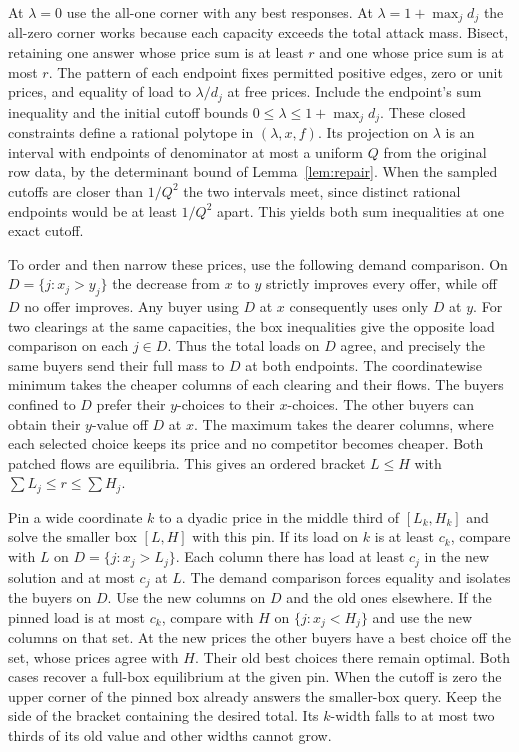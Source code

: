 \documentclass[11pt]{article}
\begin{document}
At \(\lambda=0\) use the all-one corner with any best responses. At
\(\lambda=1+\max_jd_j\) the all-zero corner works because each
capacity exceeds the total attack mass. Bisect, retaining one answer
whose price sum is at least \(r\) and one whose price sum is at most
\(r\). The pattern of each endpoint fixes permitted positive edges,
zero or unit prices, and equality of load to \(\lambda/d_j\) at free
prices. Include the endpoint's sum inequality and the initial cutoff bounds
\(0\le\lambda\le1+\max_j d_j\). These closed constraints define a rational
polytope in \((\lambda,x,f)\). Its projection on \(\lambda\) is an
interval with endpoints of denominator at most a uniform \(Q\) from
the original row data, by the determinant bound of Lemma~\ref{lem:repair}.
When the sampled cutoffs are closer than \(1/Q^2\) the two intervals
meet, since distinct rational endpoints would be at least \(1/Q^2\)
apart. This yields both sum inequalities at one exact cutoff.

To order and then narrow these prices, use the following demand
comparison. On \(D=\{j:x_j>y_j\}\) the decrease from \(x\) to \(y\)
strictly improves every offer, while off \(D\) no offer improves.
Any buyer using \(D\) at \(x\) consequently uses only \(D\) at \(y\).
For two clearings at the same capacities, the box inequalities give the
opposite load comparison on each \(j\in D\). Thus the total loads on
\(D\) agree, and precisely the same buyers send their full mass to \(D\)
at both endpoints. The coordinatewise minimum takes the cheaper
columns of each clearing and their flows. The buyers confined to \(D\)
prefer their \(y\)-choices to their \(x\)-choices. The other buyers can
obtain their \(y\)-value off \(D\) at \(x\). The maximum takes the
dearer columns, where each selected choice keeps its price and no
competitor becomes cheaper. Both patched flows are equilibria. This
gives an ordered bracket \(L\le H\) with \(\sum L_j\le r\le\sum H_j\).

Pin a wide coordinate \(k\) to a dyadic price in the middle third of
\([L_k,H_k]\) and solve the smaller box \([L,H]\) with this pin.
If its load on \(k\) is at least \(c_k\), compare with \(L\) on
\(D=\{j:x_j>L_j\}\). Each column there has load at least \(c_j\) in the
new solution and at most \(c_j\) at \(L\). The demand comparison forces
equality and isolates the buyers on \(D\). Use the new columns on \(D\)
and the old ones elsewhere. If the pinned load is at most \(c_k\),
compare with \(H\) on \(\{j:x_j<H_j\}\) and use the new columns on
that set. At the new prices the other buyers have a best choice off
the set, whose prices agree with \(H\). Their old best choices there
remain optimal. Both cases recover a full-box equilibrium at the given
pin. When the cutoff is zero the upper corner of the pinned box already
answers the smaller-box query. Keep the side of the bracket containing
the desired total. Its \(k\)-width falls to at most two thirds of its old value
and other widths cannot grow.
\end{document}
